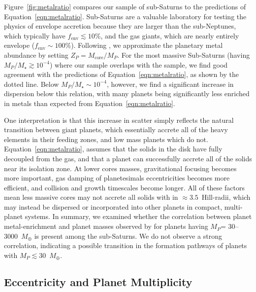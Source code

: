 \documentclass[preprint2]{aastex6}
\newcommand{\Mstar}{\ensuremath{M_{\star}}\xspace}
\newcommand{\Mp}{\ensuremath{M_{P}}\xspace}
\newcommand{\Mcore}{\ensuremath{M_{\mathrm{core}}}\xspace}
\newcommand{\fenv}{\ensuremath{f_{\mathrm{env}}}\xspace}
\newcommand{\Me}{\ensuremath{M_{\oplus}}\xspace}
\begin{document}
Figure~\ref{fig:metalratio} compares our sample of sub-Saturns to the predictions of Equation~\ref{eqn:metalratio}. Sub-Saturns are a valuable laboratory for testing the physics of envelope accretion because they are larger than the sub-Neptunes, which typically have $\fenv \lesssim 10\%$, and the gas giants, which are nearly entirely envelope ($\fenv\sim100\%$). Following \cite{Thorngren16}, we approximate the planetary metal abundance by setting $Z_P = \Mcore/\Mp$. For the most massive Sub-Saturns (having $\Mp/\Mstar \gtrsim 10^{-4}$) where our sample overlaps with the \citet{Thorngren16} sample, we find good agreement with the predictions of Equation~\ref{eqn:metalratio}, as shown by the dotted line. Below $\Mp/\Mstar\sim10^{-4}$, however, we find a significant increase in dispersion below this relation, with many planets being significantly less enriched in metals than expected from Equation~\ref{eqn:metalratio}.

One interpretation is that this increase in scatter simply reflects the natural transition between giant planets, which essentially accrete all of the heavy elements in their feeding zones, and low mass planets which do not. Equation~\ref{eqn:metalratio}, assumes that the solids in the disk have fully decoupled from the gas, and that a planet can successfully accrete all of the solids near its isolation zone. At lower cores masses, gravitational focusing becomes more important, gas damping of planetesimals eccentricities becomes more efficient, and collision and growth timescales become longer. All of these factors mean less massive cores may not accrete all solids with in $\approx3.5$~Hill-radii, which may instead be dispersed or incorporated into other planets in compact, multi-planet systems. In summary, we examined whether the correlation between planet metal-enrichment and planet masses observed by \cite{Thorngren16} for planets having \Mp = 30--3000~\Me is present among the sub-Saturns. We do not observe a strong correlation, indicating a possible transition in the formation pathways of planets with $\Mp \lesssim 30$~\Me.


\subsection{Eccentricity and Planet Multiplicity}
\label{ssec:eccentricity}
\end{document}
